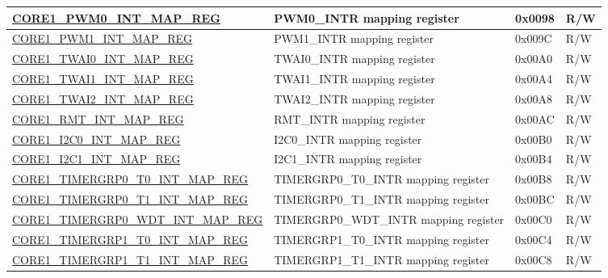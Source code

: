 \begin{longtable}{ | p{7.5cm} | p{7.2cm} | p{1.3cm} | p{1cm} | }
\hyperref[regdesc:CORE1PWM0INTMAPREG]{CORE1\_PWM0\_INT\_MAP\_REG} & PWM0\_INTR mapping register & 0x0098 & R/W \\ \hline

\hyperref[regdesc:CORE1PWM1INTMAPREG]{CORE1\_PWM1\_INT\_MAP\_REG} & PWM1\_INTR mapping register & 0x009C & R/W \\ \hline

\hyperref[regdesc:CORE1TWAI0INTMAPREG]{CORE1\_TWAI0\_INT\_MAP\_REG} & TWAI0\_INTR mapping register & 0x00A0 & R/W \\ \hline

\hyperref[regdesc:CORE1TWAI1INTMAPREG]{CORE1\_TWAI1\_INT\_MAP\_REG} & TWAI1\_INTR mapping register & 0x00A4 & R/W \\ \hline

\hyperref[regdesc:CORE1TWAI2INTMAPREG]{CORE1\_TWAI2\_INT\_MAP\_REG} & TWAI2\_INTR mapping register & 0x00A8 & R/W \\ \hline

\hyperref[regdesc:CORE1RMTINTMAPREG]{CORE1\_RMT\_INT\_MAP\_REG} & RMT\_INTR mapping register & 0x00AC & R/W \\ \hline

\hyperref[regdesc:CORE1I2C0INTMAPREG]{CORE1\_I2C0\_INT\_MAP\_REG} & I2C0\_INTR mapping register & 0x00B0 & R/W \\ \hline

\hyperref[regdesc:CORE1I2C1INTMAPREG]{CORE1\_I2C1\_INT\_MAP\_REG} & I2C1\_INTR mapping register & 0x00B4 & R/W \\ \hline

\hyperref[regdesc:CORE1TIMERGRP0T0INTMAPREG]{CORE1\_TIMERGRP0\_T0\_INT\_MAP\_REG} & TIMERGRP0\_T0\_INTR mapping register & 0x00B8 & R/W \\ \hline

\hyperref[regdesc:CORE1TIMERGRP0T1INTMAPREG]{CORE1\_TIMERGRP0\_T1\_INT\_MAP\_REG} & TIMERGRP0\_T1\_INTR mapping register & 0x00BC & R/W \\ \hline

\hyperref[regdesc:CORE1TIMERGRP0WDTINTMAPREG]{CORE1\_TIMERGRP0\_WDT\_INT\_MAP\_REG} & TIMERGRP0\_WDT\_INTR mapping register & 0x00C0 & R/W \\ \hline

\hyperref[regdesc:CORE1TIMERGRP1T0INTMAPREG]{CORE1\_TIMERGRP1\_T0\_INT\_MAP\_REG} & TIMERGRP1\_T0\_INTR mapping register & 0x00C4 & R/W \\ \hline

\hyperref[regdesc:CORE1TIMERGRP1T1INTMAPREG]{CORE1\_TIMERGRP1\_T1\_INT\_MAP\_REG} & TIMERGRP1\_T1\_INTR mapping register & 0x00C8 & R/W \\ \hline


\end{longtable}

